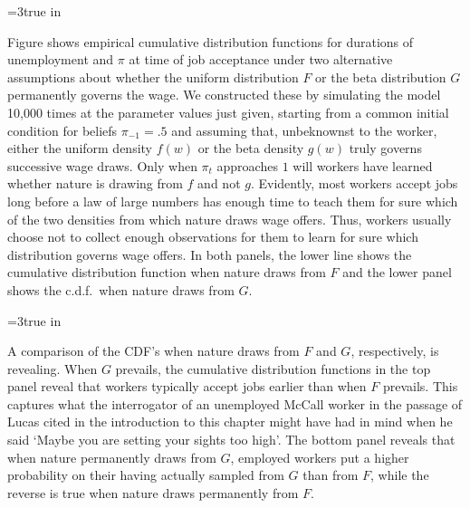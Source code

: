\centerline{\epsfxsize=3true in}
\caption{The reservation wage as a function of the posterior probability $\pi$  that the worker thinks
that the wage is drawn from the  uniform density $f$.}
\endfigure


Figure  shows empirical cumulative distribution functions for durations of unemployment and $\pi$ at time of job acceptance under two alternative assumptions about whether
the uniform distribution $F$ or the beta distribution $G$ permanently governs the wage.
We constructed these by  simulating   the model 10,000 times at the  parameter values just given, starting from a common  initial condition
for beliefs
$\pi_{-1} = .5$ and assuming that, unbeknownst to the worker,  either the uniform density $f(w)$ or the beta density $g(w)$ truly governs successive  wage draws.  Only when $\pi_t$ approaches $1$ will workers have learned
whether  nature is drawing from $f$ and not $g$.  Evidently,
most workers accept jobs long before a law of large numbers has enough time to teach them  for sure which of the two densities from which   nature draws wage offers. Thus, workers usually choose not to collect enough observations for them to learn for sure which distribution governs wage offers.   In both panels, the lower line shows the cumulative distribution function when nature draws from $F$ and the lower panel shows the c.d.f.\ when nature draws from $G$.
%
%


\centerline{\epsfxsize=3true in}
\caption{Top panel: CDF of duration of unemployment; bottom panel: CDF of $\pi$ at time worker accepts wage
and leaves unemployment. In each panel, the lower solid line is the CDF when nature permanently draws from the uniform density $f$ while
the dotted line is the CDF when nature permanently draws from the beta density $g$.}
\endfigure


A comparison of the CDF's when nature draws from $F$ and $G$, respectively, is revealing.  When $G$ prevails, the cumulative distribution functions in the top panel reveal that workers typically accept jobs earlier
than when $F$ prevails.  This  captures  what the interrogator of an unemployed  McCall worker in the passage of Lucas cited in the introduction to this chapter might have had in mind when he said `Maybe you are setting your sights too high'.
The bottom panel reveals that when nature permanently  draws from  $G$, employed workers put  a higher probability on their having actually sampled from $G$ than from $F$, while the reverse is true when nature draws permanently from $F$.


